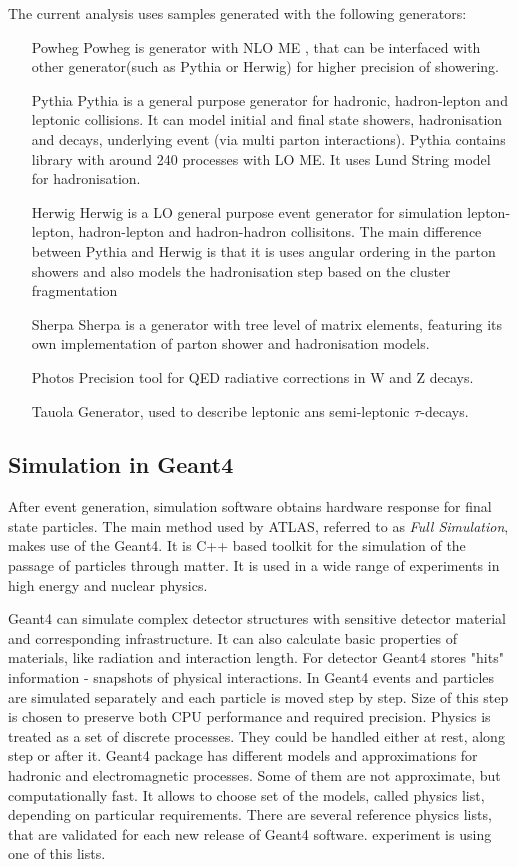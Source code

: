 The current analysis uses samples generated with the following generators:
\begin{itemize}[align=left]
\item[Powheg \cite{Powheg}] Powheg is generator with NLO ME \cite{PowhegNLO}, that can be interfaced with other generator(such as Pythia or Herwig) for higher precision of showering.
\item[Pythia \cite{Pythia6}] Pythia is a general purpose generator for hadronic, hadron-lepton and leptonic collisions. It can model initial and final state showers, hadronisation and decays, underlying event (via multi parton interactions). Pythia contains library with around 240 processes with LO ME. It uses Lund String model \cite{LundString} for hadronisation.
\item[Herwig \cite{Herwig}] Herwig is a LO general purpose event generator for simulation lepton-lepton, hadron-lepton and hadron-hadron collisitons. The main difference between Pythia and Herwig is that it is uses angular ordering in the parton showers and also models the hadronisation step based on the cluster fragmentation
\item[Sherpa \cite{Sherpa}] Sherpa is a generator with tree level of matrix elements, featuring its own implementation of parton shower and hadronisation models.
\item[Photos \cite{Photos}] Precision tool for QED radiative corrections in W and Z decays.
\item[Tauola \cite{taluola}] Generator, used to describe leptonic ans semi-leptonic $\tau$-decays.
\end{itemize}

\subsection{Simulation in Geant4}

After event generation, simulation software obtains hardware response for final state particles. The main method used by ATLAS, referred to as \textit{Full Simulation}, makes use of the Geant4\cite{Geant4}. It is C++ based toolkit for the simulation of the passage of particles through matter. It is used in a wide range of experiments in high energy and nuclear physics.

Geant4 can simulate complex detector structures with sensitive detector material and corresponding infrastructure. It can also calculate basic properties of materials, like radiation and interaction length. For detector Geant4 stores "hits" information  - snapshots of physical interactions. 
In Geant4 events and particles are simulated separately and each particle is moved step by step. Size of this step is chosen to preserve both CPU performance and required precision. Physics is treated as a set of discrete processes. They could be handled either at rest, along step or after it. Geant4 package has different models and approximations for hadronic and electromagnetic processes. Some of them are not approximate, but computationally fast. It allows to choose set of the models, called physics list, depending on particular requirements. There are several reference physics lists, that are validated for each new release of Geant4 software. \atlas experiment is using one of this lists.

